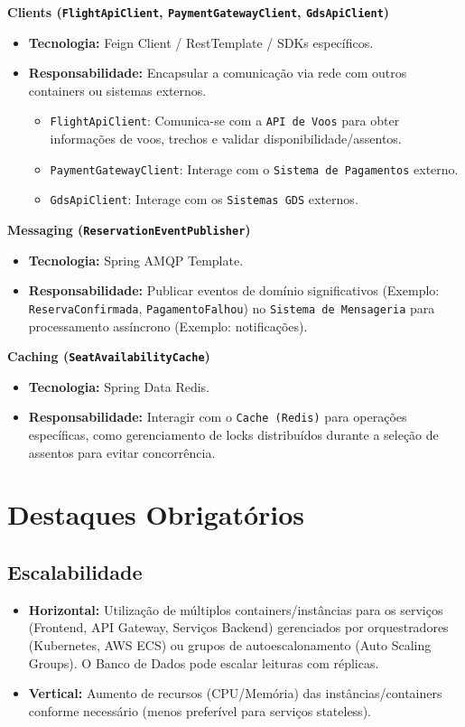 \textbf{Clients (\texttt{FlightApiClient}, \texttt{PaymentGatewayClient}, \texttt{GdsApiClient})}
\begin{itemize}
    \item \textbf{Tecnologia:} Feign Client / RestTemplate / SDKs específicos.
    \item \textbf{Responsabilidade:} Encapsular a comunicação via rede com outros containers ou sistemas externos.
    \begin{itemize}
        \item \texttt{FlightApiClient}: Comunica-se com a \texttt{API de Voos} para obter informações de voos, trechos e validar disponibilidade/assentos.
        \item \texttt{PaymentGatewayClient}: Interage com o \texttt{Sistema de Pagamentos} externo.
        \item \texttt{GdsApiClient}: Interage com os \texttt{Sistemas GDS} externos.
    \end{itemize}
\end{itemize}

\textbf{Messaging (\texttt{ReservationEventPublisher})}
\begin{itemize}
    \item \textbf{Tecnologia:} Spring AMQP Template.
    \item \textbf{Responsabilidade:} Publicar eventos de domínio significativos (Exemplo: \texttt{ReservaConfirmada}, \texttt{PagamentoFalhou}) no \texttt{Sistema de Mensageria} para processamento assíncrono (Exemplo: notificações).
\end{itemize}

\textbf{Caching (\texttt{SeatAvailabilityCache})}
\begin{itemize}
    \item \textbf{Tecnologia:} Spring Data Redis.
    \item \textbf{Responsabilidade:} Interagir com o \texttt{Cache (Redis)} para operações específicas, como gerenciamento de locks distribuídos durante a seleção de assentos para evitar concorrência.
\end{itemize}

\section{Destaques Obrigatórios}
\label{sec:destaques-obrigatorios}

\subsection{Escalabilidade}
\label{subsec:escalabilidade}
\begin{itemize}
    \item \textbf{Horizontal:} Utilização de múltiplos containers/instâncias para os serviços (Frontend, API Gateway, Serviços Backend) gerenciados por orquestradores (Kubernetes, AWS ECS) ou grupos de autoescalonamento (Auto Scaling Groups). O Banco de Dados pode escalar leituras com réplicas.
    \item \textbf{Vertical:} Aumento de recursos (CPU/Memória) das instâncias/containers conforme necessário (menos preferível para serviços stateless).
\end{itemize}


